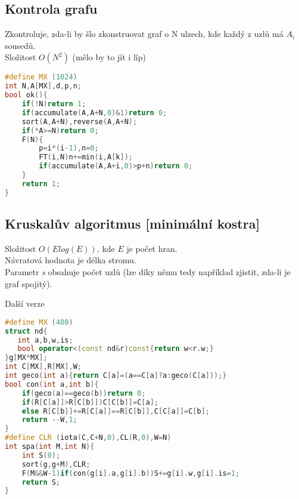 \documentclass[11pt]{article}
\begin{document}
\subsection{Kontrola grafu}
Zkontroluje, zda-li by šlo zkonstruovat graf o \textsf{N} ulzech, kde každý z uzlů má $A_i$ sousedů.
\\Složitost $O(N^2)$ (mělo by to jít i líp)
\begin{lstlisting}[language=C++]
#define MX (1024)
int N,A[MX],d,p,n;
bool ok(){
    if(!N)return 1;
    if(accumulate(A,A+N,0)&1)return 0;
    sort(A,A+N),reverse(A,A+N);
    if(*A>=N)return 0;
    F(N){
        p=i*(i-1),n=0;
        FT(i,N)n+=min(i,A[k]);
        if(accumulate(A,A+i,0)>p+n)return 0;
    }
    return 1;
}
\end{lstlisting}
\subsection{Kruskalův algoritmus [minimální kostra]}
Složitost $O(Elog(E))$, kde $E$ je počet hran.
\\Návratová hodnota je délka stromu.
\\Parametr \textit{s} obsahuje počet uzlů (lze díky němu tedy například zjistit, zda-li je graf spojitý).
\begin{center}
Další verze
\end{center}
\begin{lstlisting}[language=C++]
#define MX (400)
struct nd{
   int a,b,w,is;
   bool operator<(const nd&r)const{return w<r.w;}
}g[MX*MX];
int C[MX],R[MX],W;
int geco(int a){return C[a]=(a==C[a]?a:geco(C[a]));}
bool con(int a,int b){
    if(geco(a)==geco(b))return 0;
    if(R[C[a]]>R[C[b]])C[C[b]]=C[a];
    else R[C[b]]+=R[C[a]]==R[C[b]],C[C[a]]=C[b];
    return --W,1;
}
#define CLR (iota(C,C+N,0),CL(R,0),W=N)
int spa(int M,int N){
    int S(0);
    sort(g,g+M),CLR;
    F(M&&W-1)if(con(g[i].a,g[i].b))S+=g[i].w,g[i].is=1;
    return S;
}
\end{lstlisting}
\end{document}
